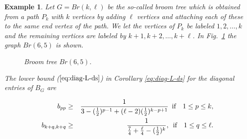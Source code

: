 \documentclass[12pt]{article}
\newtheorem{example}{Example}
\begin{document}
\begin{example}
{\rm 
Let $G=Br(k, \ell)$ be the so-called broom tree which is obtained from a path $P_k$ with $k$ vertices by adding $\ell$ vertices and attaching each of these to the same end vertex of the path.
We let the vertices of $P_k$ be labeled $1, 2, \ldots, k$ and the remaining vertices are labeled  by $k+1, k+2, \ldots, k+\ell$. In Fig.~\ref{fig_broom_tree_revision} the graph $Br(6, 5)$ is shown.
%
\begin{figure}[h]
\centering
\begin{minipage}{0.5\textwidth}
\centering

\caption{Broom tree $Br(6, 5)$.}
\label{fig_broom_tree_revision}
\end{minipage}
\end{figure} 


The lower bound ($\ref{eq:diag-L-ds}$) in Corollary \ref{eq:diag-L-ds} for the diagonal entries of $B_G$ are 

\begin{eqnarray*}
b_{pp} & \geq & \frac{1}{3-(\frac{1}{2})^{p-1} +(\ell-2) (\frac{1}{2})^{k-p+1}
} \mbox{\, if \, \,} 1 \leq p\leq k,\\
b_{k+q, k+q}& \geq &\frac{1}{
\frac{7}{4} + \frac{\ell}{4} -(\frac{1}{2})^{k}}, \mbox{\, if \, \,} 1\leq q\leq \ell.
\end{eqnarray*}

}
\end{example}
\end{document}
